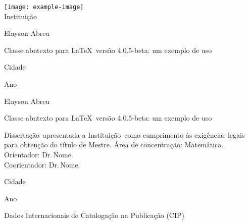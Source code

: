 \documentclass{abntexto}
\def \Autor{Elayson Abreu}
\def \Instituicao{Instituição}
\def \Cidade{Cidade}
\def \AnoDeEntrega{Ano}
\def \Titulo{Classe {\ttfamily abntexto} para \LaTeX\ versão 4.0.5-beta: um exemplo de uso}
\def \TipoDeTrabalho{Dissertação}
\def \DescricaoDoTrabalho{\TipoDeTrabalho\ apresentada a \Instituicao\ como cumprimento às exigências legais para obtenção do título de Mestre.}
\def \AreaDeConcentracao{Matemática}
\def \Orientador{Dr.\,Nome}
\def \Coorientador{Dr.\,Nome}
\def\Centro{\noindent\hfil}
\def\Direita{\noindent\hfill}
\begin{document}

\Centro
\begin{minipage}{.7\linewidth}
    \centering
    \texttt{[image: example-image]}\\
    \Instituicao
\end{minipage}
\Enter[7]

\Centro\Autor
\Enter[3]

\Centro
\begin{minipage}{.7\linewidth}
    \centering
    \Titulo
\end{minipage}
\vfill

\Centro\Cidade %

\Centro\AnoDeEntrega

\newpage


\Centro\Autor
\Enter[9]

\Centro
\begin{minipage}{.7\linewidth}
    \centering
    \Titulo
\end{minipage}
\Enter[2]

\Direita
\begin{minipage}{.5\linewidth}
    \singlesp\nohyph
    \DescricaoDoTrabalho\Enter
    Área de concentração: \AreaDeConcentracao.\\
    Orientador: \Orientador.\\
    Coorientador: \Coorientador.
\end{minipage}
\vfill

\Centro\Cidade %

\Centro\AnoDeEntrega

\newpage


\leavevmode\vfill
\Centro Dados Internacionais de Catalogação na Publicação (CIP)
\Enter[.5]

\Centro
{}
\newpage
\end{document}
